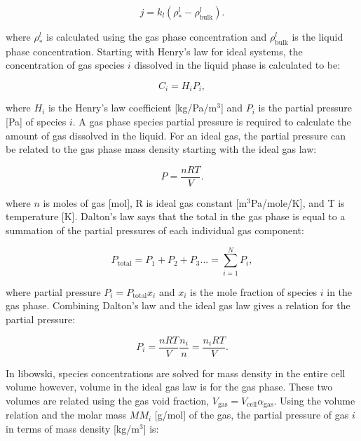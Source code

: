 \begin{equation}
    j = k_{l}(\rho^{l}_{*} - \rho^{l}_{\text{bulk}}).
\end{equation}

\noindent where $\rho^{l}_{*}$ is calculated using the gas phase concentration and $\rho^{l}_{\text{bulk}}$ is the liquid phase concentration. Starting with Henry's law for ideal systems, the concentration of gas species $i$ dissolved in the liquid phase is calculated to be:

\begin{equation}
    C_{i} = H_{i}P_{i},
\end{equation}

\noindent where $H_{i}$ is the Henry's law coefficient [kg/Pa/m$^3$] and $P_{i}$ is the partial pressure [Pa] of species $i$. A gas phase species partial pressure is required to calculate the amount of gas dissolved in the liquid. For an ideal gas, the partial pressure can be related to the gas phase mass density starting with the ideal gas law:

\begin{equation}
    P = \frac{nRT}{V}.
\end{equation}

\noindent where $n$ is moles of gas [mol], R is ideal gas constant [m$^3$Pa/mole/K], and T is temperature [K]. Dalton's law says that the total in the gas phase is equal to a summation of the partial pressures of each individual gas component:

\begin{equation}
    P_{\text{total}} = P_{1} + P_{2} + P_{3} ... = \sum_{i=1}^{N} P_{i}, 
\end{equation}

\noindent where partial pressure $P_{i} = P_{\text{total}}x_{i}$ and $x_{i}$ is the mole fraction of species $i$ in the gas phase. Combining Dalton's law and the ideal gas law gives a relation for the partial pressure:

\begin{equation}
    P_{i} = \frac{nRT}{V}\frac{n_{i}}{n} = \frac{n_{i}RT}{V}. 
\end{equation}

\noindent In libowski, species concentrations are solved for mass density in the entire cell volume however, volume in the ideal gas law is for the gas phase. These two volumes are related using the gas void fraction, $V_{\text{gas}} = V_{\text{cell}}\alpha_{\text{gas}}$. Using the volume relation and the molar mass $MM_{i}$ [g/mol] of the gas, the partial pressure of gas $i$ in terms of mass density [kg/m$^3$] is:

